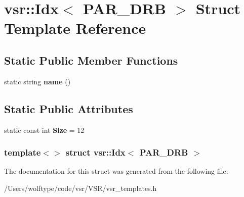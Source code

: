 \hypertarget{structvsr_1_1_idx_3_01_p_a_r___d_r_b_01_4}{\section{vsr\-:\-:Idx$<$ P\-A\-R\-\_\-\-D\-R\-B $>$ Struct Template Reference}
\label{structvsr_1_1_idx_3_01_p_a_r___d_r_b_01_4}
}
\subsection*{Static Public Member Functions}
\begin{DoxyCompactItemize}
\item 
\hypertarget{structvsr_1_1_idx_3_01_p_a_r___d_r_b_01_4_a6bc0c946d7012e5ba16dd508d14cc8a4}{static string {\bfseries name} ()}\label{structvsr_1_1_idx_3_01_p_a_r___d_r_b_01_4_a6bc0c946d7012e5ba16dd508d14cc8a4}

\end{DoxyCompactItemize}
\subsection*{Static Public Attributes}
\begin{DoxyCompactItemize}
\item 
\hypertarget{structvsr_1_1_idx_3_01_p_a_r___d_r_b_01_4_a106cf3fb429e39a8f719fa65c83d5ea2}{static const int {\bfseries Size} = 12}\label{structvsr_1_1_idx_3_01_p_a_r___d_r_b_01_4_a106cf3fb429e39a8f719fa65c83d5ea2}

\end{DoxyCompactItemize}
\subsubsection*{template$<$$>$ struct vsr\-::\-Idx$<$ P\-A\-R\-\_\-\-D\-R\-B $>$}



The documentation for this struct was generated from the following file\-:\begin{DoxyCompactItemize}
\item 
/\-Users/wolftype/code/vsr/\-V\-S\-R/vsr\-\_\-templates.\-h\end{DoxyCompactItemize}
